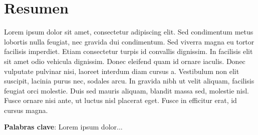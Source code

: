 \chapter{Resumen}
\doublespacing %

Lorem ipsum dolor sit amet, consectetur adipiscing elit. Sed condimentum metus lobortis nulla feugiat, nec gravida dui condimentum. Sed viverra magna eu tortor facilisis imperdiet. Etiam consectetur turpis id convallis dignissim. In facilisis elit sit amet odio vehicula dignissim. Donec eleifend quam id ornare iaculis. Donec vulputate pulvinar nisi, laoreet interdum diam cursus a. Vestibulum non elit suscipit, lacinia purus nec, sodales arcu. In gravida nibh ut velit aliquam, facilisis feugiat orci molestie. Duis sed mauris aliquam, blandit massa sed, molestie nisl. Fusce ornare nisi ante, ut luctus nisl placerat eget. Fusce in efficitur erat, id cursus magna.

\textbf{Palabras clave}: Lorem ipsum dolor...